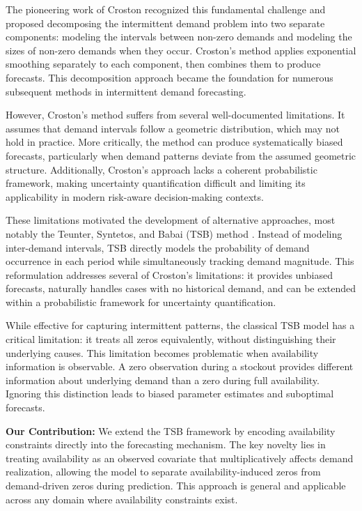 \documentclass[11pt]{amsart}
\theoremstyle{definition}
\begin{document}
The pioneering work of Croston \cite{croston1972forecasting} recognized this fundamental challenge and proposed decomposing 
the intermittent demand problem into two separate components: modeling the intervals between non-zero demands and modeling 
the sizes of non-zero demands when they occur. Croston's method applies exponential smoothing separately to each component, 
then combines them to produce forecasts. This decomposition approach became the foundation for numerous subsequent methods 
in intermittent demand forecasting.

However, Croston's method suffers from several well-documented limitations. It assumes that demand intervals follow a 
geometric distribution, which may not hold in practice. More critically, the method can produce systematically biased 
forecasts, particularly when demand patterns deviate from the assumed geometric structure. Additionally, Croston's approach 
lacks a coherent probabilistic framework, making uncertainty quantification difficult and limiting its applicability in 
modern risk-aware decision-making contexts.

These limitations motivated the development of alternative approaches, most notably the Teunter, Syntetos, and Babai (TSB) 
method \cite{teunter2011improving}. Instead of modeling inter-demand intervals, TSB directly models the probability of 
demand occurrence in each period while simultaneously tracking demand magnitude. This reformulation addresses several of 
Croston's limitations: it provides unbiased forecasts, naturally handles cases with no historical demand, and can be 
extended within a probabilistic framework for uncertainty quantification.

While effective for capturing intermittent patterns, the classical TSB model has a critical limitation: it treats all 
zeros equivalently, without distinguishing their underlying causes. This limitation becomes problematic when availability 
information is observable. A zero observation during a stockout provides different information about underlying demand 
than a zero during full availability. Ignoring this distinction leads to biased parameter estimates and suboptimal forecasts.

\textbf{Our Contribution:} We extend the TSB framework by encoding availability constraints directly into the forecasting 
mechanism. The key novelty lies in treating availability as an observed covariate that multiplicatively affects demand 
realization, allowing the model to separate availability-induced zeros from demand-driven zeros during prediction. This 
approach is general and applicable across any domain where availability constraints exist.
\end{document}
